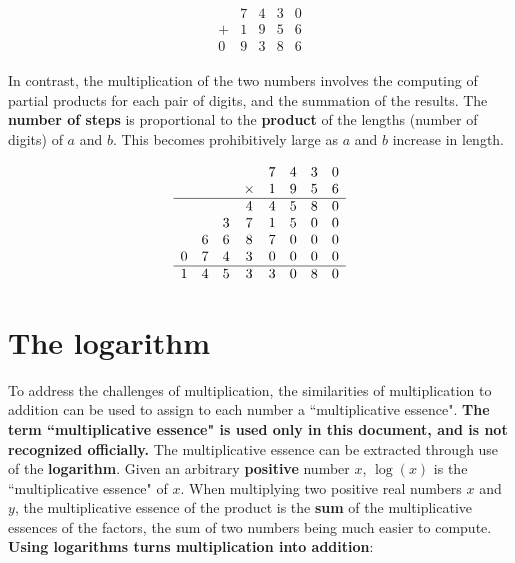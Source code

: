 \documentclass{article}
\begin{document}
\begin{align*}
\begin{array}{ccccc}
    & 7 & 4 & 3 & 0 \\ 
+ & 1 & 9 & 5 & 6 \\ 
\hline
0 & 9 & 3 & 8 & 6
\end{array}
\end{align*}

In contrast, the multiplication of the two numbers involves the computing of partial products for each pair of digits, and the summation of the results. The {\bf number of steps} is proportional to the {\bf product} of the lengths (number of digits) of \(a\) and \(b\). This becomes prohibitively large as \(a\) and \(b\) increase in length.


\begin{align*}
\begin{array}{cccccccc}
& & &            & 7 & 4 & 3 & 0 \\ 
& & & \times & 1 & 9 & 5 & 6 \\ 
\hline
   &    &    & 4 & 4 & 5 & 8 & 0 \\
   &    & 3 & 7 & 1 & 5 & 0 & 0 \\
   & 6 & 6 & 8 & 7 & 0 & 0 & 0 \\
0 & 7 & 4 & 3 & 0 & 0 & 0 & 0 \\
\hline
1 & 4 & 5 & 3 & 3 & 0 & 8 & 0 
\end{array}
\end{align*}



\section*{The logarithm}

To address the challenges of multiplication, the similarities of multiplication to addition can be used to assign to each number a ``multiplicative essence". {\bf The term ``multiplicative essence" is used only in this document, and is not recognized officially.} The multiplicative essence can be extracted through use of the {\bf logarithm}. Given an arbitrary {\bf positive} number \(x\), \(\log(x)\) is the ``multiplicative essence" of \(x\). When multiplying two positive real numbers \(x\) and \(y\), the multiplicative essence of the product is the {\bf sum} of the multiplicative essences of the factors, the sum of two numbers being much easier to compute. {\bf Using logarithms turns multiplication into addition}:
\end{document}
